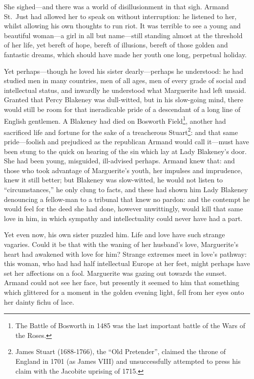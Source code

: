 \documentclass[paper=a5,BCOR=7mm,twoside,DIV=calc,12pt,usegeometry,chapterprefix,endperiod,headings=big]{scrbook}
\begin{document}
She sighed---and there was a world of disillusionment in that sigh. Armand St.~Just had allowed her to speak on without interruption: he listened to her, whilst allowing his own thoughts to run riot. It was terrible to see a young and beautiful woman---a girl in all but name---still standing almost at the threshold of her life, yet bereft of hope, bereft of illusions, bereft of those golden and fantastic dreams, which should have made her youth one long, perpetual holiday.

Yet perhaps---though he loved his sister dearly---perhaps he understood: he had studied men in many countries, men of all ages, men of every grade of social and intellectual status, and inwardly he understood what Marguerite had left unsaid. Granted that Percy Blakeney was dull-witted, but in his slow-going mind, there would still be room for that ineradicable pride of a descendant of a long line of English gentlemen. A Blakeney had died on Bosworth Field\footnote{The Battle of Bosworth in 1485 was the last important battle of the Wars of the Roses.}, another had sacrificed life and fortune for the sake of a treacherous Stuart\footnote{James Stuart (1688-1766), the \enquote{Old Pretender}, claimed the throne of England in 1701 (as James VIII) and unsuccessfully attempted to press his claim with the Jacobite uprising of 1715.}: and that same pride---foolish and prejudiced as the republican Armand would call it---must have been stung to the quick on hearing of the sin which lay at Lady Blakeney's door. She had been young, misguided, ill-advised perhaps. Armand knew that: and those who took advantage of Marguerite's youth, her impulses and imprudence, knew it still better; but Blakeney was slow-witted, he would not listen to \enquote{circumstances,} he only clung to facts, and these had shown him Lady Blakeney denouncing a fellow-man to a tribunal that knew no pardon: and the contempt he would feel for the deed she had done, however unwittingly, would kill that same love in him, in which sympathy and intellectuality could never have had a part.

Yet even now, his own sister puzzled him. Life and love have such strange vagaries. Could it be that with the waning of her husband's love, Marguerite's heart had awakened with love for him? Strange extremes meet in love's pathway: this woman, who had had half intellectual Europe at her feet, might perhaps have set her affections on a fool. Marguerite was gazing out towards the sunset. Armand could not see her face, but presently it seemed to him that something which glittered for a moment in the golden evening light, fell from her eyes onto her dainty fichu of lace.
\end{document}
